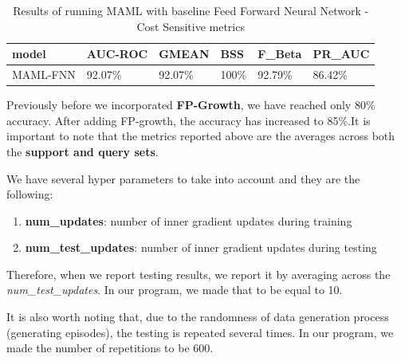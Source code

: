 \documentclass{article}
\begin{document}
\begin{table}[H]
\begin{tabular}{|l|l|l|l|l|l|}
\hline
\textbf{model} & \textbf{AUC-ROC} & \textbf{GMEAN} & \textbf{BSS} & \textbf{F\_Beta} & \textbf{PR\_AUC} \\ \hline
MAML-FNN       & 92.07\%          & 92.07\%        & 100\%        & 92.79\%          & 86.42\%          \\ \hline
\end{tabular}
\caption{Results of running MAML with baseline Feed Forward Neural Network - Cost Sensitive metrics}
\end{table}

Previously before we incorporated \textbf{FP-Growth}, we have reached only 80\% accuracy. After adding FP-growth, the accuracy has increased to 85\%.It is important to note that the metrics reported above are the averages across both the \textbf{support and query sets}.

We have several hyper parameters to take into account and they are the following:
\begin{enumerate}
    \item \textbf{num\_updates}: number of inner gradient updates during training
    \item \textbf{num\_test\_updates}: number of inner gradient updates during testing
\end{enumerate}
Therefore, when we report testing results, we report it by averaging across the \textit{num\_test\_updates}. In our program, we made that to be equal to 10.

\noindent It is also worth noting that, due to the randomness of data generation process (generating episodes), the testing is repeated several times. In our program, we made the number of repetitions to be 600.
\end{document}
